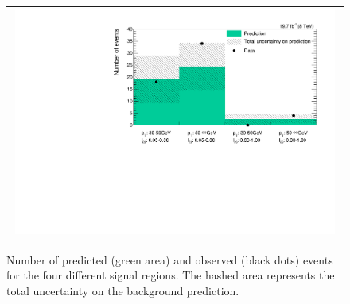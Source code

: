 


\begin{figure}[!b]
  \centering 
  \begin{tabular}{c}
    \includegraphics[width=0.98\textwidth]{figures/analysis/Results/FinalResultPlot.pdf} 
  \end{tabular}
  \caption{Number of predicted (green area) and observed (black dots) events for the four different signal regions. The hashed area represents the total uncertainty on the background prediction.}
  \label{fig:FinalResult}
\end{figure} 

